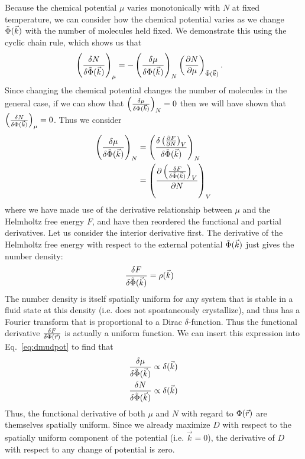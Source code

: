 Because the chemical potential $\mu$ varies monotonically with $N$ at fixed
temperature, we can consider how the chemical potential varies as we change
$\tilde\Phi(\vec k)$ with the number of molecules held fixed. We demonstrate this using the
cyclic chain rule, which shows us that
\begin{align}
    \left(\frac{\delta N}{\delta \tilde\Phi(\vec k)}\right)_{\mu} &=
    -\left(\frac{\delta \mu}{\delta \Phi(\vec k)}\right)_{N}
    \left(\frac{\partial N}{\partial \mu}\right)_{\tilde\Phi(\vec k)}.
\end{align}
Since changing the chemical potential changes the number of molecules in the general case, if we can show that $\left(\frac{\delta \mu}{\delta \Phi(\vec k)}\right)_{N}=0$ then we will have shown that $\left(\frac{\delta N}{\delta \Phi(\vec k)}\right)_{\mu}=0$.  Thus we consider
\begin{align}
    \left(\frac{\delta \mu}{\delta \tilde{\Phi}(\vec k)}\right)_N
    &= \left(\frac{\delta \left(\frac{\partial F}{\partial N}\right)_{V}}{\delta \tilde\Phi(\vec k)}\right)_N
    \\
    &= \left(\frac{\partial \left(\frac{\delta F}{\delta \tilde\Phi(\vec k)}\right)_{V}}{\partial N}\right)_{V}
    \label{eq:dmudpot}
\end{align}
where we have made use of the derivative relationship between $\mu$ and the Helmholtz free energy $F$, and have then reordered the functional and partial derivatives.
Let us consider the interior derivative first.  The derivative of the Helmholtz free energy with respect to the external potential $\tilde\Phi(\vec k)$ just gives the number density:
\begin{align}
    \frac{\delta F}{\delta \tilde\Phi(\vec k)} &= \rho(\vec k)
\end{align}
The number density is itself spatially uniform for any system that is stable in a fluid state at this density (i.e. does not spontaneously crystallize), and thus has a Fourier transform that is proportional to a Dirac $\delta$-function.  Thus the functional derivative $\frac{\delta F}{\delta \Phi(\vec r)}$ is actually a uniform function.
We can insert this expression into Eq.~\ref{eq:dmudpot} to find that
\begin{align}
    \frac{\delta \mu}{\delta \tilde\Phi(\vec k)} &\propto \delta(\vec k) \\
    \frac{\delta N}{\delta \tilde\Phi(\vec k)} &\propto \delta(\vec k)
\end{align}
Thus, the functional derivative of both $\mu$ and $N$ with regard to $\Phi(\vec r)$ are themselves spatially uniform.  Since we already maximize $D$ with respect to the spatially uniform component of the potential (i.e. $\vec k=0$), the derivative of $D$ with respect to any change of potential is zero.

